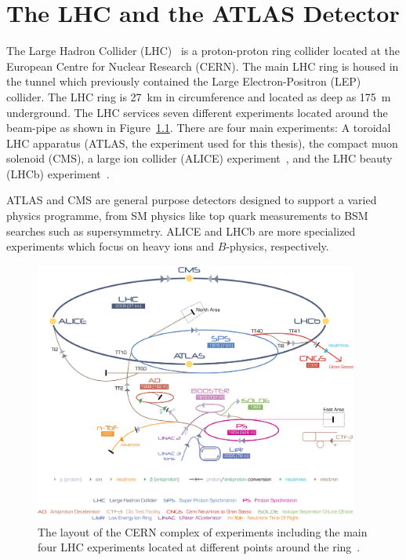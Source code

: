\newcommand{\rphi}{\ensuremath{R\textrm{-}\phi}}

\chapter{The LHC and the ATLAS Detector}\label{ch:Detector}

The Large Hadron Collider (LHC)~\cite{LHC} is a proton-proton ring collider located at the European Centre for Nuclear Research (CERN). The main LHC ring is housed in the tunnel which previously contained the Large Electron-Positron (LEP) collider. The LHC ring is \SI{27}{\kilo\meter} in circumference and located as deep as \SI{175}{\meter} underground. The LHC services seven different experiments located around the beam-pipe as shown in Figure~\ref{fig:DetectorLHCLayout}. There are four main experiments: A toroidal LHC apparatus (ATLAS, the experiment used for this thesis), the compact muon solenoid (CMS), a large ion collider (ALICE) experiment~\cite{ALICE}, and the LHC beauty (LHCb) experiment~\cite{LHCb}. 

ATLAS and CMS are general purpose detectors designed to support a varied physics programme, from SM physics like top quark measurements to BSM searches such as supersymmetry. ALICE and LHCb are more specialized experiments which focus on heavy ions and $B$-physics, respectively.

\begin{figure}[htbp]
  \centering
    \includegraphics[width=0.95\textwidth]{PartDetector/Diagrams/Cern-Accelerator-Complex.jpg}
    \caption[The layout of the CERN complex of experiments including the main four LHC experiments located at different points around the ring.]{The layout of the CERN complex of experiments including the main four LHC experiments located at different points around the ring~\cite{Detector:CERNComplex}.}\label{fig:DetectorLHCLayout}
\end{figure}

